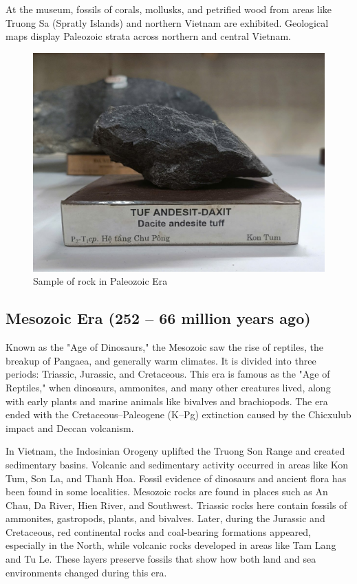 At the museum, fossils of corals, mollusks, and petrified wood from areas like Truong Sa (Spratly Islands) and northern Vietnam are exhibited. Geological maps display Paleozoic strata across northern and central Vietnam.

\begin{figure}[H]
  \centering
  \includegraphics[max width=0.8\linewidth]{graphics/figure_04.jpg}
  \caption{Sample of rock in Paleozoic Era}
  \label{fig:paleozoic-rock}
\end{figure}

\subsection{Mesozoic Era (252 – 66 million years ago)}
\label{subsec:mesozoic}

Known as the "Age of Dinosaurs," the Mesozoic saw the rise of reptiles, the breakup of Pangaea, and generally warm climates. It is divided into three periods: Triassic, Jurassic, and Cretaceous. This era is famous as the "Age of Reptiles," when dinosaurs, ammonites, and many other creatures lived, along with early plants and marine animals like bivalves and brachiopods. The era ended with the Cretaceous–Paleogene (K–Pg) extinction caused by the Chicxulub impact and Deccan volcanism.

In Vietnam, the Indosinian Orogeny uplifted the Truong Son Range and created sedimentary basins. Volcanic and sedimentary activity occurred in areas like Kon Tum, Son La, and Thanh Hoa. Fossil evidence of dinosaurs and ancient flora has been found in some localities. Mesozoic rocks are found in places such as An Chau, Da River, Hien River, and Southwest. Triassic rocks here contain fossils of ammonites, gastropods, plants, and bivalves. Later, during the Jurassic and Cretaceous, red continental rocks and coal-bearing formations appeared, especially in the North, while volcanic rocks developed in areas like Tam Lang and Tu Le. These layers preserve fossils that show how both land and sea environments changed during this era.

